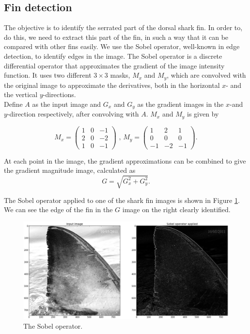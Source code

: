 \documentclass[a4paper,10pt]{article}
\begin{document}
\subsection{Fin detection}
The objective is to identify the serrated part of the dorsal shark fin. In order
to, do this, we need to extract this part of the fin, in such a way that it can be 
compared with other fins easily.
We use the
Sobel operator,
well-known in edge detection, to identify edges in the image.
The Sobel operator is a discrete differential operator that approximates the
gradient of the image intensity function.  It uses two different $3 \times 3$
masks, $M_x$ and $M_y$, which are convolved with the original image to
approximate the
derivatives, both in the horizontal $x$-
and the vertical $y$-directions.  \\

Define $A$ as the input image and $G_x$ and $G_y$ as the gradient images in the
$x$-and $y$-direction respectively,
after convolving with $A$.  $M_x$ and $M_y$ is given by

\[
 M_x = \begin{pmatrix*}
        1 & 0 & -1 \\
        2 & 0 & -2 \\
        1 & 0 & -1
       \end{pmatrix*}
\mbox{ , }
 M_y = \begin{pmatrix*}
        1 & 2 & 1 \\
        0 & 0 & 0 \\
        -1 & -2 & -1
       \end{pmatrix*}
.\]

At each point in the image, the gradient approximations can be combined to give
the gradient magnitude image, calculated  as
\[
 G = \sqrt{G_x^2+G_y^2}
.\]

The Sobel operator applied to one of the shark fin images is shown in Figure 
\ref{sobel}.
We can see the edge of the fin in the $G$ image on the right clearly
identified.

\begin{figure}[H]
 \centering
 \includegraphics[width=5in]{sobel.jpg}
 \caption{The Sobel operator.}
 \label{sobel}
\end{figure}
\end{document}
